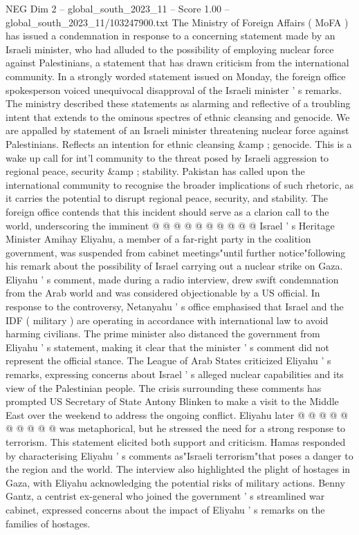 \begin{textsample}{NEG Dim 2 – global\_south\_2023\_11 – Score 1.00 – global\_south\_2023\_11/103247900.txt}  \label{ex:f2_neg_358}
The Ministry of Foreign Affairs ( MoFA ) has issued a condemnation in response to a concerning statement made by an Israeli minister, who had alluded to the possibility of employing nuclear force against Palestinians, a statement that has drawn criticism from the international community.
In a strongly worded statement issued on Monday, the foreign office spokesperson voiced unequivocal disapproval of the Israeli minister ' s remarks.
The ministry described these statements as alarming and reflective of a troubling intent that extends to the ominous spectres of ethnic cleansing and genocide.
We are appalled by statement of an Israeli minister threatening nuclear force against Palestinians.
Reflects an intention for ethnic cleansing \&amp ; genocide.
This is a wake up call for int'l community to the threat posed by Israeli aggression to regional peace, security \&amp ; stability.
Pakistan has called upon the international community to recognise the broader implications of such rhetoric, as it carries the potential to disrupt regional peace, security, and stability.
The foreign office contends that this incident should serve as a clarion call to the world, underscoring the imminent @ @ @ @ @ @ @ @ @ @ Israel ' s Heritage Minister Amihay Eliyahu, a member of a far-right party in the coalition government, was suspended from cabinet meetings"until further notice"following his remark about the possibility of Israel carrying out a nuclear strike on Gaza.
Eliyahu ' s comment, made during a radio interview, drew swift condemnation from the Arab world and was considered objectionable by a US official.
In response to the controversy, Netanyahu ' s office emphasised that Israel and the IDF ( military ) are operating in accordance with international law to avoid harming civilians.
The prime minister also distanced the government from Eliyahu ' s statement, making it clear that the minister ' s comment did not represent the official stance.
The League of Arab States criticized Eliyahu ' s remarks, expressing concerns about Israel ' s alleged nuclear capabilities and its view of the Palestinian people.
The crisis surrounding these comments has prompted US Secretary of State Antony Blinken to make a visit to the Middle East over the weekend to address the ongoing conflict.
Eliyahu later @ @ @ @ @ @ @ @ @ @ was metaphorical, but he stressed the need for a strong response to terrorism.
This statement elicited both support and criticism.
Hamas responded by characterising Eliyahu ' s comments as"Israeli terrorism"that poses a danger to the region and the world.
The interview also highlighted the plight of hostages in Gaza, with Eliyahu acknowledging the potential risks of military actions.
Benny Gantz, a centrist ex-general who joined the government ' s streamlined war cabinet, expressed concerns about the impact of Eliyahu ' s remarks on the families of hostages.

\end{textsample}
